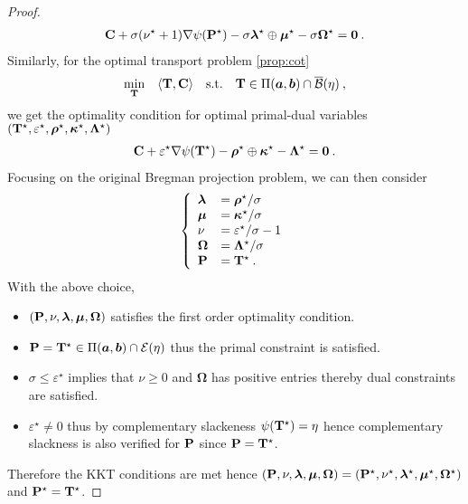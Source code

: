 \begin{proof}
    \begin{align}
        {\mathbf{C}} + \sigma (\nu^\star + 1) \nabla \psi({\mathbf{P}}^\star) -  \sigma \bm{\lambda}^\star \oplus \bm{\mu}^\star - \sigma \mathbf{\Omega}^\star= \bm{0} \:.
    \end{align}
    Similarly, for the optimal transport problem \eqref{prop:cot}
    \begin{align}
        \min_{{\mathbf{T}}} \quad \langle {\mathbf{T}}, {\mathbf{C}} \rangle \quad \text{s.t.} \quad  {\mathbf{T}} \in \Pi(\bm{a}, \bm{b}) \cap \overline{\mathcal{B}}(\eta) \:,
    \end{align}
    we get the optimality condition for optimal primal-dual variables $({\mathbf{T}}^\star, \varepsilon^\star, \bm{\rho}^\star, \bm{\kappa}^\star, \mathbf{\Lambda}^\star)$
    \begin{align}
        \mathbf{C} + \varepsilon^\star \nabla \psi({\mathbf{T}}^\star) -  \bm{\rho}^\star \oplus \bm{\kappa}^{\star} - \mathbf{\Lambda}^\star = \bm{0} \:.
    \end{align}
    Focusing on the original Bregman projection problem, we can then consider
    \begin{align}
        \left\{
        \begin{array}{ll}
            \bm{\lambda} &= \bm{\rho}^\star / \sigma \\
            \bm{\mu} &= \bm{\kappa}^\star / \sigma \\
            \nu &= \varepsilon^\star / \sigma - 1 \\
            \mathbf{\Omega} &= \mathbf{\Lambda}^\star / \sigma \\
            {\mathbf{P}} &= {\mathbf{T}}^\star \:.
        \end{array}
    \right.
    \end{align}
    With the above choice, 
    \begin{itemize}
        \item  $({\mathbf{P}}, \nu, \bm{\lambda}, \bm{\mu}, \mathbf{\Omega})$ satisfies the first order optimality condition.
        \item ${\mathbf{P}} = {\mathbf{T}}^\star \in \Pi(\bm{a}, \bm{b}) \cap \mathcal{E}(\eta)$ thus the primal constraint is satisfied. 
        \item $\sigma \leq \varepsilon^\star$ implies that $\nu \geq 0$ and $\mathbf{\Omega}$ has positive entries thereby dual constraints are satisfied. 
        \item $\varepsilon^\star \neq 0$ thus by complementary slackeness $\psi({\mathbf{T}}^\star) = \eta$ hence complementary slackness is also verified for ${\mathbf{P}}$ since ${\mathbf{P}} = {\mathbf{T}}^\star$.
    \end{itemize}
    Therefore the KKT conditions are met hence $({\mathbf{P}}, \nu, \bm{\lambda}, \bm{\mu}, \mathbf{\Omega}) = ({\mathbf{P}}^\star, \nu^\star, \bm{\lambda}^\star, \bm{\mu}^\star, \mathbf{\Omega}^\star)$ and ${\mathbf{P}}^\star = {\mathbf{T}}^\star$.
\end{proof}

